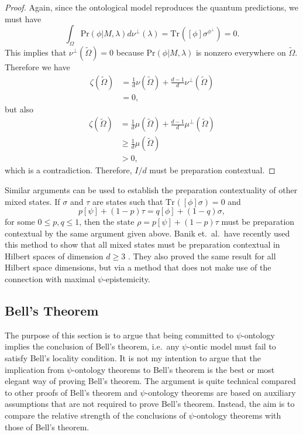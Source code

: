 \documentclass[DIV=calc,fontsize=12pt]{scrartcl} %
\theoremstyle{definition}
\theoremstyle{plain}
\newcommand{\Proj}[1]{\ensuremath{\left [ #1 \right ]}}
\newcommand{\Tr}[2][]{\ensuremath{\text{Tr}_{#1} \left ( #2 \right )}}
\begin{document}
\begin{proof}
Again, since the ontological model reproduces the quantum
predictions, we must have
\begin{equation}
\int_{\Omega} \text{Pr}(\phi|M,\lambda) d\nu^{\perp}(\lambda) =
\Tr{\Proj{\phi}\sigma^{\phi^{\perp}}} = 0.
\end{equation}
This implies that $\nu^{\perp}(\tilde{\Omega}) = 0$ because
$\text{Pr}(\phi|M,\lambda)$ is nonzero everywhere on $\tilde{\Omega}$.
Therefore we have
\begin{align}
\zeta(\tilde{\Omega}) & = \frac{1}{d} \nu(\tilde{\Omega}) +
\frac{d-1}{d} \nu^{\perp}(\tilde{\Omega}) \\
& = 0,
\end{align}
but also
\begin{align}
\zeta(\tilde{\Omega}) & = \frac{1}{d} \mu(\tilde{\Omega}) +
\frac{d-1}{d} \mu^{\perp}(\tilde{\Omega}) \\
& \geq \frac{1}{d} \mu(\tilde{\Omega}) \\
& > 0,
\end{align}
which is a contradiction.  Therefore, $I/d$ must be preparation
contextual.
\end{proof}

Similar arguments can be used to establish the preparation
contextuality of other mixed states.  If $\sigma$ and $\tau$ are states
such that $\Tr{\Proj{\phi}\sigma} = 0$ and
\begin{equation}
p \Proj{\psi} + (1-p)\tau = q \Proj{\phi} + (1-q) \sigma,
\end{equation}
for some $0 \leq p,q \leq 1$, then the state $\rho = p \Proj{\psi} +
(1-p)\tau$ must be preparation contextual by the same argument given
above.  Banik et.\ al.\ have recently used this method to show that
all mixed states must be preparation contextual in Hilbert spaces of
dimension $d \geq 3$ \cite{Banik2014}.  They also proved the same
result for all Hilbert space dimensions, but via a method that does
not make use of the connection with maximal $\psi$-epistemicity.  

\subsection{Bell's Theorem}

\label{Bell}

The purpose of this section is to argue that being committed to
$\psi$-ontology implies the conclusion of Bell's theorem, i.e.\ any
$\psi$-ontic model must fail to satisfy Bell's locality condition.  It
is not my intention to argue that the implication from $\psi$-ontology
theorems to Bell's theorem is the best or most elegant way of proving
Bell's theorem.  The argument is quite technical compared to other
proofs of Bell's theorem and $\psi$-ontology theorems are based on
auxiliary assumptions that are not required to prove Bell's theorem.
Instead, the aim is to compare the relative strength of the
conclusions of $\psi$-ontology theorems with those of Bell's theorem.
\end{document}
